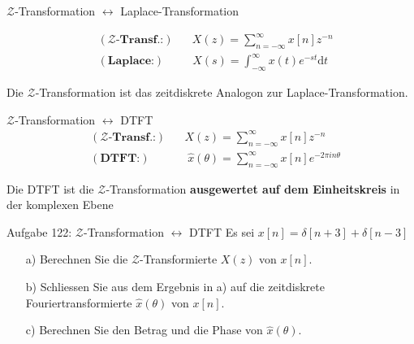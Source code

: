\documentclass[14pt, aspectratio=169, handout]{beamer}
\begin{document}
\begin{frame}{$\mathcal{Z}$-Transformation $\leftrightarrow$ Laplace-Transformation}
    \noindent

\begin{align*}
    &(\textbf{$\mathcal{Z}$-Transf.:}) \hspace{20pt} X(z) = \sum_{n=-\infty}^\infty x[n] z^{-n} \\
    &(\textbf{Laplace:}) \hspace{30pt} X(s) = \int_{-\infty}^\infty x(t) e^{-st} \text{d}t
\end{align*}

Die $\mathcal{Z}$-Transformation ist das zeitdiskrete Analogon zur Laplace-Transformation.
\end{frame}

\begin{frame}{$\mathcal{Z}$-Transformation $\leftrightarrow$ DTFT}
    \begin{align*}
        &(\textbf{$\mathcal{Z}$-Transf.:}) \hspace{20pt} X(z) = \sum_{n=-\infty}^\infty x[n] z^{-n} \\
        &(\textbf{DTFT:}) \hspace{40pt} \hat{x}(\theta) = \sum_{n=-\infty}^\infty x[n] e^{-2 \pi i n \theta} 
    \end{align*}

    Die DTFT ist die $\mathcal{Z}$-Transformation \textbf{ausgewertet auf dem Einheitskreis} in der komplexen Ebene
\end{frame}

\begin{frame}{Aufgabe 122: $\mathcal{Z}$-Transformation $\leftrightarrow$ DTFT}
    Es sei $x[n] = \delta[n+3] + \delta[n-3]$
\begin{itemize}
    \item[a)] Berechnen Sie die $\mathcal{Z}$-Transformierte $X(z)$ von $x[n]$.
    \item[b)] Schliessen Sie aus dem Ergebnis in a) auf die zeitdiskrete Fouriertransformierte $\hat{x}(\theta)$ von $x[n]$.
    \item[c)] Berechnen Sie den Betrag und die Phase von $\hat{x}(\theta)$.
    \item[]
    \item[] 
    \item[]
    \item[]
    \item[]
    \item[] 
\end{itemize}
\end{frame}
\end{document}
